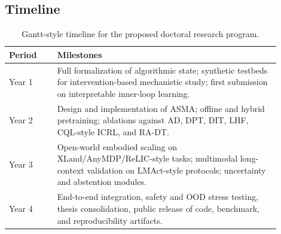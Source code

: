 \documentclass[10pt,twocolumn,letterpaper]{article}
\begin{document}
\subsection{Timeline}
\begin{table}[h]
\centering
\small
\begin{tabular}{p{0.16\linewidth}p{0.74\linewidth}}
\toprule
\textbf{Period} & \textbf{Milestones} \\
\midrule
Year 1 & Full formalization of algorithmic state; synthetic testbeds for intervention-based mechanistic study; first submission on interpretable inner-loop learning. \\
Year 2 & Design and implementation of ASMA; offline and hybrid pretraining; ablations against AD, DPT, DIT, LHF, CQL-style ICRL, and RA-DT. \\
Year 3 & Open-world embodied scaling on XLand/AnyMDP/ReLIC-style tasks; multimodal long-context validation on LMAct-style protocols; uncertainty and abstention modules. \\
Year 4 & End-to-end integration, safety and OOD stress testing, thesis consolidation, public release of code, benchmark, and reproducibility artifacts. \\
\bottomrule
\end{tabular}
\caption{Gantt-style timeline for the proposed doctoral research program.}
\label{tab:timeline}
\end{table}
\end{document}
